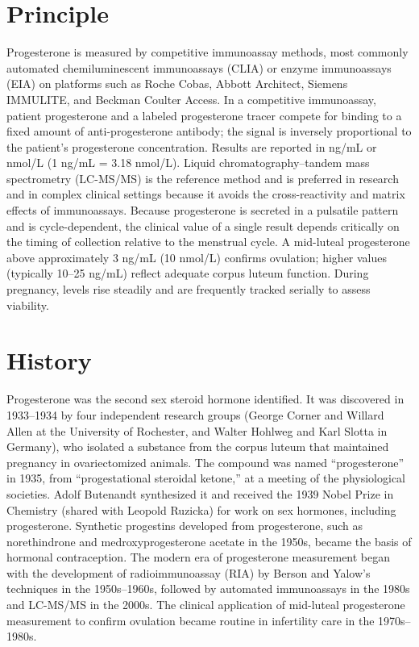 \section*{Principle}
Progesterone is measured by competitive immunoassay methods, most commonly automated chemiluminescent immunoassays (CLIA) or enzyme immunoassays (EIA) on platforms such as Roche Cobas, Abbott Architect, Siemens IMMULITE, and Beckman Coulter Access. In a competitive immunoassay, patient progesterone and a labeled progesterone tracer compete for binding to a fixed amount of anti-progesterone antibody; the signal is inversely proportional to the patient's progesterone concentration. Results are reported in ng/mL or nmol/L (1 ng/mL = 3.18 nmol/L). Liquid chromatography--tandem mass spectrometry (LC-MS/MS) is the reference method and is preferred in research and in complex clinical settings because it avoids the cross-reactivity and matrix effects of immunoassays. Because progesterone is secreted in a pulsatile pattern and is cycle-dependent, the clinical value of a single result depends critically on the timing of collection relative to the menstrual cycle. A mid-luteal progesterone above approximately 3 ng/mL (10 nmol/L) confirms ovulation; higher values (typically 10--25 ng/mL) reflect adequate corpus luteum function. During pregnancy, levels rise steadily and are frequently tracked serially to assess viability.

\section*{History}
Progesterone was the second sex steroid hormone identified. It was discovered in 1933--1934 by four independent research groups (George Corner and Willard Allen at the University of Rochester, and Walter Hohlweg and Karl Slotta in Germany), who isolated a substance from the corpus luteum that maintained pregnancy in ovariectomized animals. The compound was named ``progesterone'' in 1935, from ``progestational steroidal ketone,'' at a meeting of the physiological societies. Adolf Butenandt synthesized it and received the 1939 Nobel Prize in Chemistry (shared with Leopold Ruzicka) for work on sex hormones, including progesterone. Synthetic progestins developed from progesterone, such as norethindrone and medroxyprogesterone acetate in the 1950s, became the basis of hormonal contraception. The modern era of progesterone measurement began with the development of radioimmunoassay (RIA) by Berson and Yalow's techniques in the 1950s--1960s, followed by automated immunoassays in the 1980s and LC-MS/MS in the 2000s. The clinical application of mid-luteal progesterone measurement to confirm ovulation became routine in infertility care in the 1970s--1980s.

